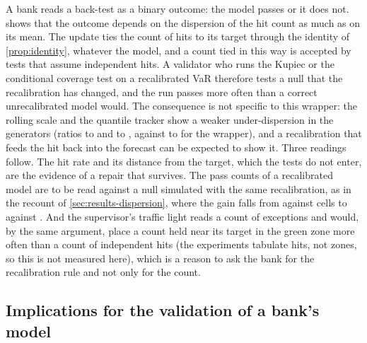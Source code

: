 A bank reads a back-test as a binary outcome: the model passes or it does not.  shows that the outcome depends on the dispersion of the hit count as much as on its mean. The update ties the count of hits to its target through the identity of \cref{prop:identity}, whatever the model, and a count tied in this way is accepted by tests that assume independent hits. A validator who runs the Kupiec or the conditional coverage test on a recalibrated VaR therefore tests a null that the recalibration has changed, and the run passes more often than a correct unrecalibrated model would. The consequence is not specific to this wrapper: the rolling scale and the quantile tracker show a weaker under-dispersion in the generators (ratios \dispRatioRollMin{} to \dispRatioRollMax{} and \dispRatioTrkMin{} to \dispRatioTrkMax{}, against \dispRatioAciMin{} to \dispRatioAciMax{} for the wrapper), and a recalibration that feeds the hit back into the forecast can be expected to show it. Three readings follow. The hit rate and its distance from the target, which the tests do not enter, are the evidence of a repair that survives. The pass counts of a recalibrated model are to be read against a null simulated with the same recalibration, as in the recount of \cref{sec:results-dispersion}, where the gain falls from \tenPassAci{} against \tenPassUnw{} cells to \dispCWrapCal{} against \dispCUnwExact{}. And the supervisor's traffic light reads a count of exceptions and would, by the same argument, place a count held near its target in the green zone more often than a count of independent hits (the experiments tabulate hits, not zones, so this is not measured here), which is a reason to ask the bank for the recalibration rule and not only for the count.

\subsection{Implications for the validation of a bank's model}
\label{sec:discussion-implications}

